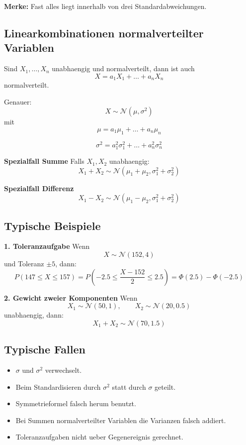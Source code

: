 \documentclass[a4paper,11pt]{article}
\begin{document}
\textbf{Merke:}
Fast alles liegt innerhalb von drei Standardabweichungen.

\subsection{Linearkombinationen normalverteilter Variablen}
Sind $X_1,\dots,X_n$ unabhaengig und normalverteilt, dann ist auch
\[
X=a_1X_1+\dots+a_nX_n
\]
normalverteilt.

Genauer:
\[
X\sim \mathcal N(\mu,\sigma^2)
\]
mit
\[
\mu=a_1\mu_1+\dots+a_n\mu_n
\]

\[
\sigma^2=a_1^2\sigma_1^2+\dots+a_n^2\sigma_n^2
\]

\textbf{Spezialfall Summe}
Falls $X_1,X_2$ unabhaengig:
\[
X_1+X_2 \sim \mathcal N(\mu_1+\mu_2,\sigma_1^2+\sigma_2^2)
\]

\textbf{Spezialfall Differenz}
\[
X_1-X_2 \sim \mathcal N(\mu_1-\mu_2,\sigma_1^2+\sigma_2^2)
\]

\subsection{Typische Beispiele}
\textbf{1. Toleranzaufgabe}
Wenn
\[
X\sim \mathcal N(152,4)
\]
und Toleranz $\pm 5$, dann:
\[
P(147\le X\le 157)
=P\left(-2.5\le \frac{X-152}{2}\le 2.5\right)
=\Phi(2.5)-\Phi(-2.5)
\]

\textbf{2. Gewicht zweier Komponenten}
Wenn
\[
X_1\sim \mathcal N(50,1),\qquad X_2\sim \mathcal N(20,0.5)
\]
unabhaengig, dann:
\[
X_1+X_2 \sim \mathcal N(70,1.5)
\]

\subsection{Typische Fallen}
\begin{itemize}
  \item $\sigma$ und $\sigma^2$ verwechselt.
  \item Beim Standardisieren durch $\sigma^2$ statt durch $\sigma$ geteilt.
  \item Symmetrieformel falsch herum benutzt.
  \item Bei Summen normalverteilter Variablen die Varianzen falsch addiert.
  \item Toleranzaufgaben nicht ueber Gegenereignis gerechnet.
\end{itemize}
\end{document}

